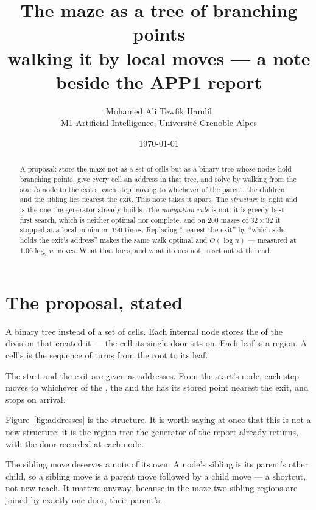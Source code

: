 \documentclass[11pt,a4paper]{article}
\title{The maze as a tree of branching points\\
       \large walking it by local moves --- a note beside the APP1 report}
\author{Mohamed Ali Tewfik Hamlil\\[2pt]
  \small M1 Artificial Intelligence, Universit\'e Grenoble Alpes}
\date{\today}
\begin{document}
\maketitle

\begin{abstract}
A proposal: store the maze not as a set of cells but as a binary tree whose
nodes hold branching points, give every cell an address in that tree, and solve
by walking from the start's node to the exit's, each step moving to whichever of
the parent, the children and the sibling lies nearest the exit. This note takes
it apart. The \emph{structure} is right and is the one the generator already
builds. The \emph{navigation rule} is not: it is greedy best-first search, which
is neither optimal nor complete, and on $200$ mazes of $32\times32$ it stopped
at a local minimum $199$ times. Replacing ``nearest the exit'' by ``which side
holds the exit's address'' makes the same walk optimal and $\Theta(\log n)$ ---
measured at $1.06\log_2 n$ moves. What that buys, and what it does not, is set
out at the end.
\end{abstract}

\section{The proposal, stated}

\begin{description}[leftmargin=*,style=nextline,itemsep=5pt]
  \item[Structure.] A binary tree instead of a set of cells. Each internal node
    stores the  of the division that created it --- the
    cell its single door sits on. Each leaf is a region. A cell's
     is the sequence of turns from the root to its leaf.
  \item[Solver.] The start and the exit are given as addresses. From the start's
    node, each step moves to whichever of the , the
     and the  has its stored point nearest
    the exit, and stops on arrival.
\end{description}

Figure~\ref{fig:addresses} is the structure. It is worth saying at once that
this is not a new structure: it is the region tree the generator of the report
already returns, with the door recorded at each node.



The sibling move deserves a note of its own. A node's sibling is its parent's
other child, so a sibling move is a parent move followed by a child move --- a
shortcut, not new reach. It matters anyway, because in the maze two sibling
regions are joined by exactly one door, their parent's. 
\end{document}

